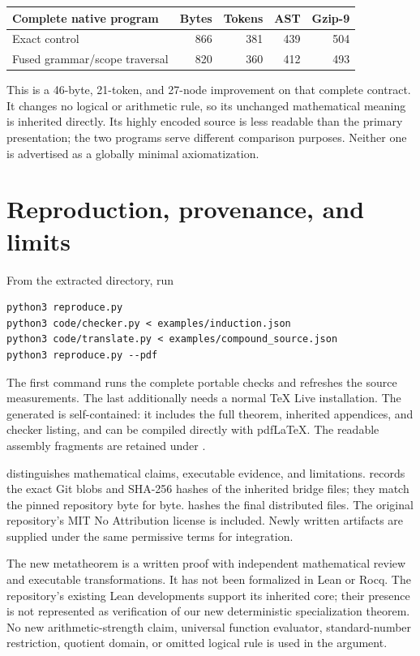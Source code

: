 \documentclass[11pt,letterpaper]{article}
\theoremstyle{definition}
\begin{document}
\begin{center}
\begin{tabular}{lrrrr}
\toprule
Complete native program & Bytes & Tokens & AST & Gzip-9\\
\midrule
Exact control & 866 & 381 & 439 & 504\\
Fused grammar/scope traversal & 820 & 360 & 412 & 493\\
\bottomrule
\end{tabular}
\end{center}
This is a 46-byte, 21-token, and 27-node improvement on that complete
contract. It changes no logical or arithmetic rule, so its unchanged
mathematical meaning is inherited directly. Its highly encoded source
is less readable than the primary presentation; the two programs serve
different comparison purposes. Neither one is advertised as a globally
minimal axiomatization.

\section{Reproduction, provenance, and limits}

From the extracted directory, run
\begin{lstlisting}
python3 reproduce.py
python3 code/checker.py < examples/induction.json
python3 code/translate.py < examples/compound_source.json
python3 reproduce.py --pdf
\end{lstlisting}
The first command runs the complete portable checks and refreshes the
source measurements. The last additionally needs a normal TeX Live
installation. The generated  is self-contained:
it includes the full theorem, inherited appendices, and checker listing,
and can be compiled directly with pdfLaTeX. The readable assembly
fragments are retained under .

 distinguishes mathematical claims, executable evidence,
and limitations.  records the exact Git
blobs and SHA-256 hashes of the inherited bridge files; they match the
pinned repository byte for byte.  hashes the final
distributed files. The original repository's MIT No Attribution license
is included. Newly written artifacts are supplied under the same
permissive terms for integration.

The new metatheorem is a written proof with independent mathematical
review and executable transformations. It has not been formalized in
Lean or Rocq. The repository's existing Lean developments support its
inherited core; their presence is not represented as verification of
our new deterministic specialization theorem. No new arithmetic-strength
claim, universal function evaluator, standard-number restriction,
quotient domain, or omitted logical rule is used in the argument.
\end{document}
